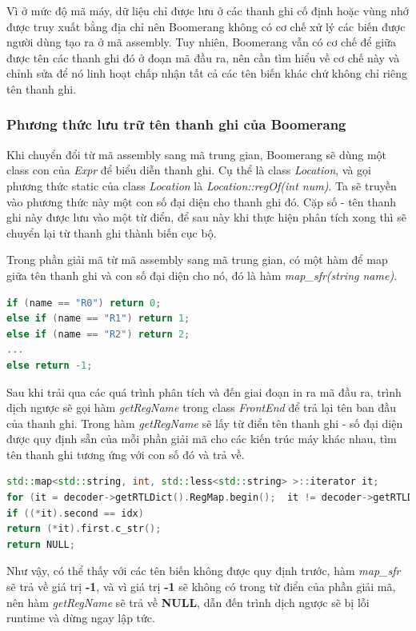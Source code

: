 Vì ở mức độ mã máy, dữ liệu chỉ được lưu ở các thanh ghi cố định hoặc vùng nhớ được truy xuất bằng địa chỉ nên Boomerang không có cơ chế xử lý các biến được người dùng tạo ra ở mã assembly. Tuy nhiên, Boomerang vẫn có cơ chế để giữa được tên các thanh ghi đó ở đoạn mã đầu ra, nên cần tìm hiểu về cơ chế này và chỉnh sửa để nó linh hoạt chấp nhận tất cả các tên biến khác chứ không chỉ riêng tên thanh ghi.

\subsubsection{Phương thức lưu trữ tên thanh ghi của Boomerang}
Khi chuyển đổi từ mã assembly sang mã trung gian, Boomerang sẽ dùng một class con của \textit{Expr} để biểu diễn thanh ghi. Cụ thể là class \textit{Location}, và gọi phương thức static của class \textit{Location} là \textit{Location::regOf(int num)}. Ta sẽ truyền vào phương thức này một con số đại diện cho thanh ghi đó. Cặp số - tên thanh ghi này được lưu vào một từ điển, để sau này khi thực hiện phân tích xong thì sẽ chuyển lại từ thanh ghi thành biến cục bộ.

Trong phần giải mã từ mã assembly sang mã trung gian, có một hàm để map giữa tên thanh ghi và con số đại diện cho nó, đó là hàm \textit{map\_sfr(string name)}.
\begin{lstlisting}[caption={Một số phần mã trong hàm map\_sfr},label={list:listmapsfr},language=c++]
if (name == "R0") return 0;
else if (name == "R1") return 1;
else if (name == "R2") return 2;
...
else return -1;

\end{lstlisting}

Sau khi trải qua các quá trình phân tích và đến giai đoạn in ra mã đầu ra, trình dịch ngược sẽ gọi hàm \textit{getRegName} trong class \textit{FrontEnd} để trả lại tên ban đầu của thanh ghi. Trong hàm \textit{getRegName} sẽ lấy từ điển tên thanh ghi - số đại diện được quy định sẵn của mỗi phần giải mã cho các kiến trúc máy khác nhau, tìm tên thanh ghi tương ứng với con số đó và trả về.
\begin{lstlisting}[caption={Phần mã trong hàm getRegName},label={list:listgetregname},language=c++]
std::map<std::string, int, std::less<std::string> >::iterator it;
for (it = decoder->getRTLDict().RegMap.begin();	 it != decoder->getRTLDict().RegMap.end(); it++)
if ((*it).second == idx) 
return (*it).first.c_str();
return NULL;
\end{lstlisting}


Như vậy, có thể thấy với các tên biến không được quy định trước, hàm \textit{map\_sfr} sẽ trả về giá trị \textbf{-1}, và vì giá trị \textbf{-1} sẽ không có trong từ điển của phần giải mã, nên hàm \textit{getRegName} sẽ trả về \textbf{NULL}, dẫn đến trình dịch ngược sẽ bị lỗi runtime và dừng ngay lập tức.\\

